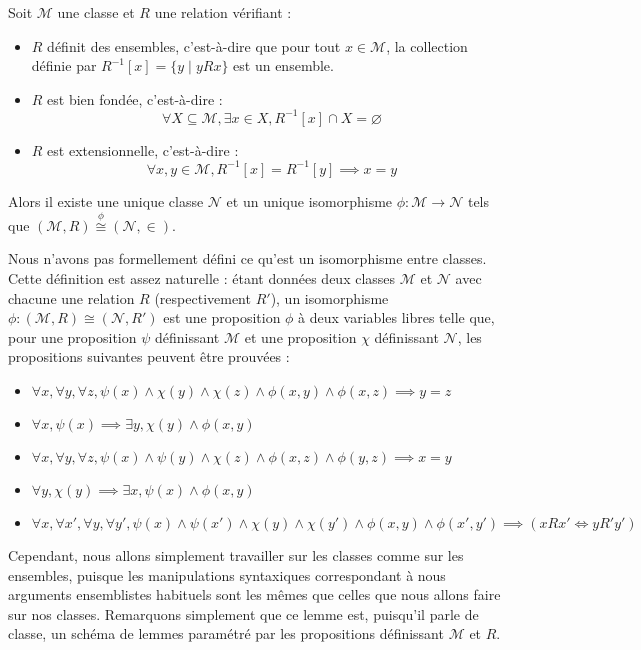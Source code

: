 \begin{lemma}\label{lem.most}
  Soit $\mathcal M$ une classe et $R$ une relation vérifiant :
  \begin{itemize}
  \item $R$ définit des ensembles, c'est-à-dire que pour tout $x\in \mathcal M$,
    la collection définie par $R^{-1}[x] = \{y\mid y R x\}$ est un ensemble.
  \item $R$ est bien fondée, c'est-à-dire :
    \[\forall X\subseteq \mathcal M, \exists x \in X, R^{-1}[x]\cap X =
    \varnothing\]
  \item $R$ est extensionnelle, c'est-à-dire :
    \[\forall x,y\in \mathcal M, R^{-1}[x] = R^{-1}[y] \implies x = y\]
  \end{itemize}

  Alors il existe une unique classe $\mathcal N$ et un unique isomorphisme
  $\phi : \mathcal M\to \mathcal N$ tels que
  $(\mathcal M,R) \overset{\phi}{\cong} (\mathcal N,\in)$.
\end{lemma}

\begin{remark}
  Nous n'avons pas formellement défini ce qu'est un isomorphisme entre classes.
  Cette définition est assez naturelle : étant données deux classes $\mathcal M$
  et $\mathcal N$ avec chacune une relation $R$ (respectivement $R'$), un
  isomorphisme $\phi : (\mathcal M,R)\cong (\mathcal N,R')$ est une proposition
  $\phi$ à deux variables libres telle que, pour une proposition $\psi$
  définissant $\mathcal M$ et une proposition $\chi$ définissant $\mathcal N$,
  les propositions suivantes peuvent être prouvées :
  \begin{itemize}
  \item $\forall x,\forall y,\forall z, \psi(x)\land \chi(y)\land\chi(z)\land
    \phi(x,y)\land\phi(x,z) \implies y = z$
  \item $\forall x,\psi(x)\implies \exists y, \chi(y)\land \phi(x,y)$
  \item $\forall x,\forall y,\forall z, \psi(x)\land\psi(y)\land\chi(z)\land
    \phi(x,z)\land\phi(y,z)\implies x = y$
  \item $\forall y,\chi(y)\implies \exists x, \psi(x)\land \phi(x,y)$
  \item $\forall x,\forall x',\forall y, \forall y', \psi(x)\land\psi(x')\land
    \chi(y)\land\chi(y')\land\phi(x,y)\land\phi(x',y')\implies
    (xR x'\iff yR' y')$
  \end{itemize}

  Cependant, nous allons simplement travailler sur les classes comme sur les
  ensembles, puisque les manipulations syntaxiques correspondant à nous
  arguments ensemblistes habituels sont les mêmes que celles que nous allons
  faire sur nos classes. Remarquons simplement que ce lemme est, puisqu'il parle
  de classe, un schéma de lemmes paramétré par les propositions définissant
  $\mathcal M$ et $R$.
\end{remark}

